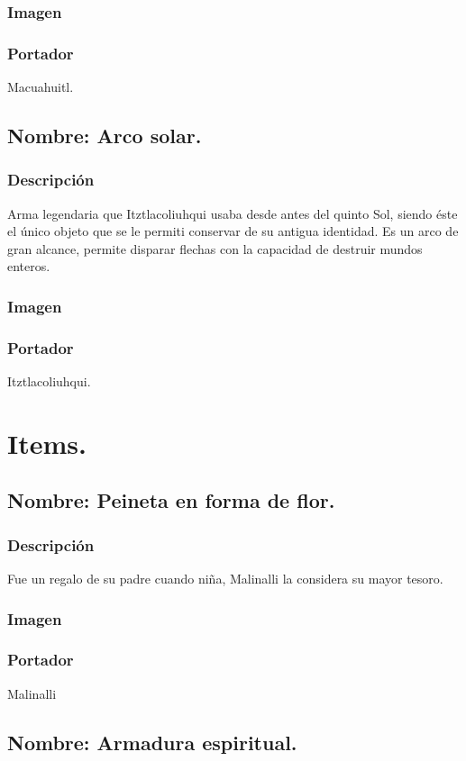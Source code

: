 \documentclass[11pt,letterpaper]{article}
\begin{document}
\subsubsection{Imagen}
\subsubsection{Portador}
Macuahuitl.

\subsection{Nombre: Arco solar.}
\subsubsection{Descripción}
Arma legendaria que Itztlacoliuhqui usaba desde antes del quinto Sol, siendo éste el único objeto que se le permiti conservar de su antigua identidad. Es un arco de gran alcance, permite disparar flechas con la capacidad de destruir mundos enteros. 
\subsubsection{Imagen}
\subsubsection{Portador}
Itztlacoliuhqui.



\section{Items.}
	\subsection{Nombre: Peineta en forma de flor.}
	\subsubsection{Descripción}
	Fue un regalo de su padre cuando niña, Malinalli la considera su mayor tesoro.
	\subsubsection{Imagen}
	\subsubsection{Portador}
	Malinalli 

	\subsection{Nombre: Armadura espiritual.}
\end{document}
